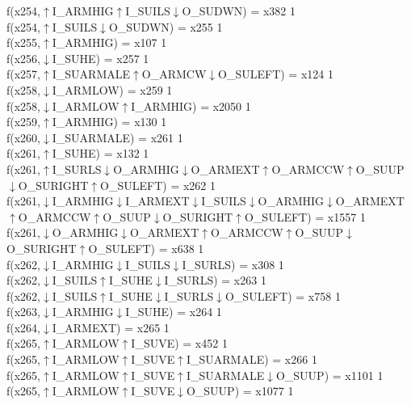 f(x254,$\uparrow$I\_ARMHIG$\uparrow$I\_SUILS$\downarrow$O\_SUDWN) = x382 {1} \\
f(x254,$\uparrow$I\_SUILS$\downarrow$O\_SUDWN) = x255 {1} \\
f(x255,$\uparrow$I\_ARMHIG) = x107 {1} \\
f(x256,$\downarrow$I\_SUHE) = x257 {1} \\
f(x257,$\uparrow$I\_SUARMALE$\uparrow$O\_ARMCW$\downarrow$O\_SULEFT) = x124 {1} \\
f(x258,$\downarrow$I\_ARMLOW) = x259 {1} \\
f(x258,$\downarrow$I\_ARMLOW$\uparrow$I\_ARMHIG) = x2050 {1} \\
f(x259,$\uparrow$I\_ARMHIG) = x130 {1} \\
f(x260,$\downarrow$I\_SUARMALE) = x261 {1} \\
f(x261,$\uparrow$I\_SUHE) = x132 {1} \\
f(x261,$\uparrow$I\_SURLS$\downarrow$O\_ARMHIG$\downarrow$O\_ARMEXT$\uparrow$O\_ARMCCW$\uparrow$O\_SUUP$\downarrow$O\_SURIGHT$\uparrow$O\_SULEFT) = x262 {1} \\
f(x261,$\downarrow$I\_ARMHIG$\downarrow$I\_ARMEXT$\downarrow$I\_SUILS$\downarrow$O\_ARMHIG$\downarrow$O\_ARMEXT$\uparrow$O\_ARMCCW$\uparrow$O\_SUUP$\downarrow$O\_SURIGHT$\uparrow$O\_SULEFT) = x1557 {1} \\
f(x261,$\downarrow$O\_ARMHIG$\downarrow$O\_ARMEXT$\uparrow$O\_ARMCCW$\uparrow$O\_SUUP$\downarrow$O\_SURIGHT$\uparrow$O\_SULEFT) = x638 {1} \\
f(x262,$\downarrow$I\_ARMHIG$\downarrow$I\_SUILS$\downarrow$I\_SURLS) = x308 {1} \\
f(x262,$\downarrow$I\_SUILS$\uparrow$I\_SUHE$\downarrow$I\_SURLS) = x263 {1} \\
f(x262,$\downarrow$I\_SUILS$\uparrow$I\_SUHE$\downarrow$I\_SURLS$\downarrow$O\_SULEFT) = x758 {1} \\
f(x263,$\downarrow$I\_ARMHIG$\downarrow$I\_SUHE) = x264 {1} \\
f(x264,$\downarrow$I\_ARMEXT) = x265 {1} \\
f(x265,$\uparrow$I\_ARMLOW$\uparrow$I\_SUVE) = x452 {1} \\
f(x265,$\uparrow$I\_ARMLOW$\uparrow$I\_SUVE$\uparrow$I\_SUARMALE) = x266 {1} \\
f(x265,$\uparrow$I\_ARMLOW$\uparrow$I\_SUVE$\uparrow$I\_SUARMALE$\downarrow$O\_SUUP) = x1101 {1} \\
f(x265,$\uparrow$I\_ARMLOW$\uparrow$I\_SUVE$\downarrow$O\_SUUP) = x1077 {1} \\
